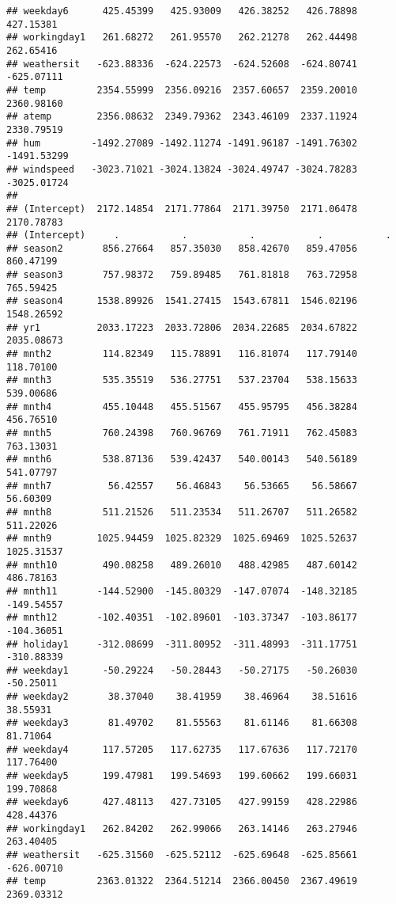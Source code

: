 \documentclass[]{article}
\begin{document}
\begin{verbatim}
## weekday6      425.45399   425.93009   426.38252   426.78898   427.15381
## workingday1   261.68272   261.95570   262.21278   262.44498   262.65416
## weathersit   -623.88336  -624.22573  -624.52608  -624.80741  -625.07111
## temp         2354.55999  2356.09216  2357.60657  2359.20010  2360.98160
## atemp        2356.08632  2349.79362  2343.46109  2337.11924  2330.79519
## hum         -1492.27089 -1492.11274 -1491.96187 -1491.76302 -1491.53299
## windspeed   -3023.71021 -3024.13824 -3024.49747 -3024.78283 -3025.01724
##                                                                        
## (Intercept)  2172.14854  2171.77864  2171.39750  2171.06478  2170.78783
## (Intercept)     .           .           .           .           .      
## season2       856.27664   857.35030   858.42670   859.47056   860.47199
## season3       757.98372   759.89485   761.81818   763.72958   765.59425
## season4      1538.89926  1541.27415  1543.67811  1546.02196  1548.26592
## yr1          2033.17223  2033.72806  2034.22685  2034.67822  2035.08673
## mnth2         114.82349   115.78891   116.81074   117.79140   118.70100
## mnth3         535.35519   536.27751   537.23704   538.15633   539.00686
## mnth4         455.10448   455.51567   455.95795   456.38284   456.76510
## mnth5         760.24398   760.96769   761.71911   762.45083   763.13031
## mnth6         538.87136   539.42437   540.00143   540.56189   541.07797
## mnth7          56.42557    56.46843    56.53665    56.58667    56.60309
## mnth8         511.21526   511.23534   511.26707   511.26582   511.22026
## mnth9        1025.94459  1025.82329  1025.69469  1025.52637  1025.31537
## mnth10        490.08258   489.26010   488.42985   487.60142   486.78163
## mnth11       -144.52900  -145.80329  -147.07074  -148.32185  -149.54557
## mnth12       -102.40351  -102.89601  -103.37347  -103.86177  -104.36051
## holiday1     -312.08699  -311.80952  -311.48993  -311.17751  -310.88339
## weekday1      -50.29224   -50.28443   -50.27175   -50.26030   -50.25011
## weekday2       38.37040    38.41959    38.46964    38.51616    38.55931
## weekday3       81.49702    81.55563    81.61146    81.66308    81.71064
## weekday4      117.57205   117.62735   117.67636   117.72170   117.76400
## weekday5      199.47981   199.54693   199.60662   199.66031   199.70868
## weekday6      427.48113   427.73105   427.99159   428.22986   428.44376
## workingday1   262.84202   262.99066   263.14146   263.27946   263.40405
## weathersit   -625.31560  -625.52112  -625.69648  -625.85661  -626.00710
## temp         2363.01322  2364.51214  2366.00450  2367.49619  2369.03312

\end{verbatim}
\end{document}

